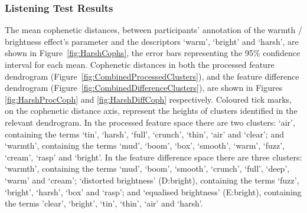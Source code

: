 		\subsubsection{Listening Test Results}
			The mean cophenetic distances, between participants' annotation of the warmth / brightness effect's
			parameter and the descriptors `warm', `bright' and `harsh', are shown in
			Figure~\ref{fig:HarshCophs}, the error bars representing the 95\% confidence interval for each
			mean.  Cophenetic distances in both the processed feature dendrogram
			(Figure~\ref{fig:CombinedProcessedClusters}), and the feature difference dendrogram
			(Figure~\ref{fig:CombinedDifferenceClusters}), are shown in Figures \ref{fig:HarshProcCoph} and
			\ref{fig:HarshDiffCoph} respectively. Coloured tick marks, on the cophenetic distance axis,
			represent the heights of clusters identified in the relevant dendrogram. In the processed feature
			space there are two clusters: `air', containing the terms `tin', `harsh', `full', `crunch', `thin',
			`air' and `clear'; and `warmth', containing the terms `mud', `boom', `box', `smooth', `warm',
			`fuzz', `cream', `rasp' and `bright'. In the feature difference space there are three clusters:
			`warmth', containing the terms `mud', `boom', `smooth', `crunch', `full', `deep', `warm' and
			`cream'; `distorted brightness' (D:bright), containing the terms `fuzz', `bright', `harsh', `box'
			and `rasp'; and `equalised brightness' (E:bright), containing the terms 'clear', `bright', `tin',
			`thin', `air' and `harsh'.

